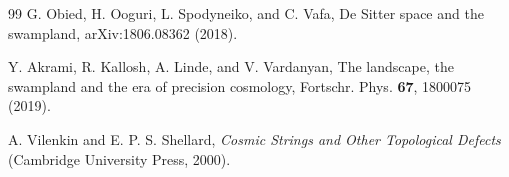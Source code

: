 \documentclass[pdflatex,sn-mathphys-num]{sn-jnl}
\theoremstyle{thmstyleone}
\begin{document}
\begin{thebibliography}{99}
 G. Obied, H. Ooguri, L. Spodyneiko, and C. Vafa, De Sitter space and the swampland, arXiv:1806.08362 (2018).

 Y. Akrami, R. Kallosh, A. Linde, and V. Vardanyan, The landscape, the swampland and the era of precision cosmology, Fortschr. Phys. \textbf{67}, 1800075 (2019).

 A. Vilenkin and E. P. S. Shellard, \textit{Cosmic Strings and Other Topological Defects} (Cambridge University Press, 2000).

\end{thebibliography}
\end{document}
